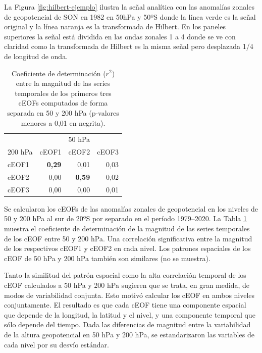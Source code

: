 \documentclass[12pt,oneside,a4paper]{reedthesis}
\begin{document}
La Figura \ref{fig:hilbert-ejemplo} ilustra la señal analítica con las anomalías zonales de geopotencial de SON en 1982 en 50hPa y 50ºS donde la línea verde es la señal original y la línea naranja es la transformada de Hilbert.
En los paneles superiores la señal está dividida en las ondas zonales 1 a 4 donde se ve con claridad como la transformada de Hilbert es la misma señal pero desplazada 1/4 de longitud de onda.



\begin{table}

\caption{\label{tab:corr-ceof-splitted}Coeficiente de determinación (\(r^2\)) entre la magnitud de las series temporales de los primeros tres cEOFs computados de forma separada en 50 y 200 hPa (p-valores menores a 0,01 en negrita).}
\centering
\begin{tabular}[t]{l>{}r>{}r>{}r}
\toprule
\multicolumn{1}{c}{} & \multicolumn{3}{c}{50 hPa} \\
\cmidrule(l{3pt}r{3pt}){2-4}
200 hPa & cEOF1 & cEOF2 & cEOF3\\
\midrule
cEOF1 & \textbf{0,29} & 0,01 & 0,03\\
cEOF2 & 0,00 & \textbf{0,59} & 0,02\\
cEOF3 & 0,00 & 0,00 & 0,01\\
\bottomrule
\end{tabular}
\end{table}

Se calcularon los cEOFs de las anomalías zonales de geopotencial en los niveles de 50 y 200 hPa al sur de 20ºS por separado en el período 1979--2020.
La Tabla \ref{tab:corr-ceof-splitted} muestra el coeficiente de determinación de la magnitud de las series temporales de los cEOF entre 50 y 200 hPa.
Una correlación significativa entre la magnitud de los respectivos cEOF1 y cEOF2 en cada nivel.
Los patrones espaciales de los cEOF de 50 hPa y 200 hPa también son similares (no se muestra).

Tanto la similitud del patrón espacial como la alta correlación temporal de los cEOF calculados a 50 hPa y 200 hPa sugieren que se trata, en gran medida, de modos de variabilidad conjunta.
Esto motivó calcular los cEOF en ambos niveles conjuntamente.
El resultado es que cada cEOF tiene una componente espacial que depende de la longitud, la latitud y el nivel, y una componente temporal que sólo depende del tiempo.
Dada las diferencias de magnitud entre la variabilidad de la altura geopotencial en 50 hPa y 200 hPa, se estandarizaron las variables de cada nivel por su desvío estándar.
\end{document}
